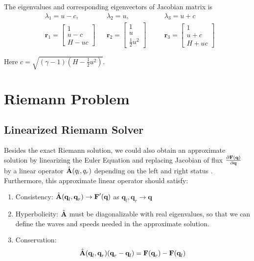 \documentclass[11pt]{diazessay} %
\begin{document}
    The eigenvalues and corresponding eigenvectors of Jacobian matrix is
    $$
    \begin{aligned}
        & \lambda_1 = u -c, &&\lambda_2 = u,\quad && \lambda_3 = u+c\\
        &\textbf{r}_1 =\begin{bmatrix} 1 \\ u-c \\H-uc\end{bmatrix}
        &&\textbf{r}_2 =\begin{bmatrix} 1 \\ u \\ \frac{1}{2}u^2 \end{bmatrix}\quad
        &&\textbf{r}_3 =\begin{bmatrix} 1\\ u+c \\H+uc\end{bmatrix}
    \end{aligned}
    $$

    Here $c=\sqrt{(\gamma - 1)(H-\frac{1}{2}u^2)}$.    \cite{david_i_ketcheson_chapter_2020, roe_approximate_1981}

\section{Riemann Problem}
\subsection{Linearized Riemann Solver}

Besides the exact Riemann solution, we could also obtain an approximate solution by linearizing the Euler Equation and replacing Jacobian of flux $\frac{\partial \bf{F}(\textbf{q})}{\partial \bf{q}}$ by a linear operator $\hat{\bf{A}}(q_l, q_r)$ depending on the left and right status \cite{roe_approximate_1981}. Furthermore, this approximate linear operator should satisfy:


\begin{enumerate}

\item Consistency: $\hat{\bf{A}}(\textbf{q}_l, \textbf{q}_r) \rightarrow \textbf{F}'(\textbf{q})$ as $\textbf{q}_l, \textbf{q}_r \rightarrow \textbf{q}$
\item Hyperbolicity: $\hat{\bf{A}}$ must be diagonalizable with real eigenvalues, so that we can define the waves and speeds needed in the approximate solution.
\item Conservation: 
\begin{equation}\label{eq:conservation}
\hat{\bf{A}}(\textbf{q}_l, \textbf{q}_r)(\textbf{q}_r-\textbf{q}_l) = \textbf{F}(\textbf{q}_r) - \textbf{F}(\textbf{q}_l)
\end{equation}
\end{enumerate}
\end{document}
